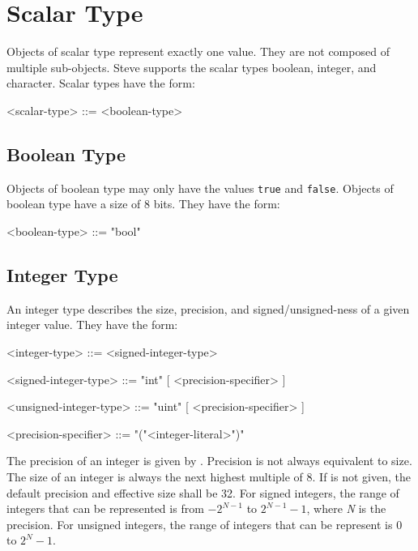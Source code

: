 \section{Scalar Type} \label{guide:scalar_type}

Objects of scalar type represent exactly one value. They are not composed of multiple sub-objects. Steve supports the scalar types boolean, integer, and character. Scalar types have the form:

\begin{minip}
\begin{grammar}
<scalar-type> ::= <boolean-type>
\end{grammar}
\end{minip}

\subsection{Boolean Type} \label{guide:bool_type}

Objects of boolean type may only have the values \texttt{true} and \texttt{false}. Objects of boolean type have a size of 8 bits. They have the form:

\begin{minip}
\begin{grammar}
<boolean-type> ::= "bool"
\end{grammar}
\end{minip}

\subsection{Integer Type} \label{guide:integer_type}

An integer type describes the size, precision, and signed/unsigned-ness of a given integer value. They have the form:

\begin{minip}
\begin{grammar}
<integer-type> ::= <signed-integer-type>

<signed-integer-type> ::= "int" [ <precision-specifier> ]

<unsigned-integer-type> ::= "uint" [ <precision-specifier> ]

<precision-specifier> ::= "("<integer-literal>")"
\end{grammar}
\end{minip}

The precision of an integer is given by .
Precision is not always equivalent to size. The size of an integer is
always the next highest multiple of 8.
If  is not given, the default precision and effective size shall be 32. For signed integers, the range of integers that can be represented is from $-2^{N-1}$ to $2^{N-1}-1$, where \textit{N} is the precision. For unsigned integers, the range of integers that can be represent is $0$ to $2^{N}-1$.

